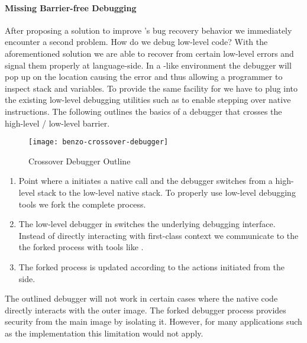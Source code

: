 \paragraph{Missing Barrier-free Debugging}
After proposing a solution to improve \B's bug recovery behavior we immediately encounter a second problem.
How do we debug low-level code?
With the aforementioned solution we are able to recover from certain low-level errors and signal them properly at language-side.
In a \ST-like environment the debugger will pop up on the location causing the error and thus allowing a programmer to inspect stack and variables.
To provide the same facility for \B we have to plug into the existing low-level debugging utilities such as  to enable stepping over native instructions.
The following  outlines the basics of a debugger that crosses the high-level / low-level barrier.
%
\begin{figure}[h]
	\centering
	\texttt{[image: benzo-crossover-debugger]}
	\caption{\B Crossover Debugger Outline}
\end{figure}
%
\begin{enumerate}
	\item Point where a \B initiates a native call and the debugger switches from a high-level \PH stack to the low-level native stack.
To properly use low-level debugging tools we fork the complete \VM process.
	\item The low-level debugger in \PH switches the underlying debugging interface.
Instead of directly interacting with first-class \PH context we communicate to the the forked process with tools like .
	\item The forked process is updated according to the actions initiated from the \PH side.
\end{enumerate}

\noindent The outlined debugger will not work in certain cases where the native code directly interacts with the outer image.
The forked debugger process provides security from the main \PH image by isolating it.
However, for many \B applications such as the \FFI implementation this limitation would not apply.

